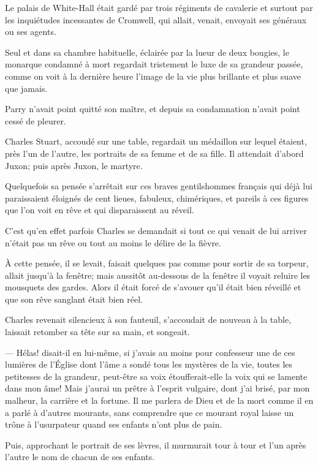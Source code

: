 Le palais de White-Hall était gardé par trois régiments de cavalerie et surtout par les inquiétudes incessantes de Cromwell, qui allait, venait, envoyait ses généraux ou ses agents.

Seul et dans sa chambre habituelle, éclairée par la lueur de deux bougies, le monarque condamné à mort regardait tristement le luxe de sa grandeur passée, comme on voit à la dernière heure l'image de la vie plus brillante et plus suave que jamais.

Parry n'avait point quitté son maître, et depuis sa condamnation n'avait point cessé de pleurer.

Charles Stuart, accoudé sur une table, regardait un médaillon sur lequel étaient, près l'un de l'autre, les portraits de sa femme et de sa fille. Il attendait d'abord Juxon; puis après Juxon, le martyre.

Quelquefois sa pensée s'arrêtait sur ces braves gentilshommes français qui déjà lui paraissaient éloignés de cent lieues, fabuleux, chimériques, et pareils à ces figures que l'on voit en rêve et qui disparaissent au réveil.

C'est qu'en effet parfois Charles se demandait si tout ce qui venait de lui arriver n'était pas un rêve ou tout au moins le délire de la fièvre.

À cette pensée, il se levait, faisait quelques pas comme pour sortir de sa torpeur, allait jusqu'à la fenêtre; mais aussitôt au-dessous de la fenêtre il voyait reluire les mousquets des gardes. Alors il était forcé de s'avouer qu'il était bien réveillé et que son rêve sanglant était bien réel.

Charles revenait silencieux à son fauteuil, s'accoudait de nouveau à la table, laissait retomber sa tête sur sa main, et songeait.

— Hélas! disait-il en lui-même, si j'avais au moins pour confesseur une de ces lumières de l'Église dont l'âme a sondé tous les mystères de la vie, toutes les petitesses de la grandeur, peut-être sa voix étoufferait-elle la voix qui se lamente dans mon âme! Mais j'aurai un prêtre à l'esprit vulgaire, dont j'ai brisé, par mon malheur, la carrière et la fortune. Il me parlera de Dieu et de la mort comme il en a parlé à d'autres mourants, sans comprendre que ce mourant royal laisse un trône à l'usurpateur quand ses enfants n'ont plus de pain.

Puis, approchant le portrait de ses lèvres, il murmurait tour à tour et l'un après l'autre le nom de chacun de ses enfants.


